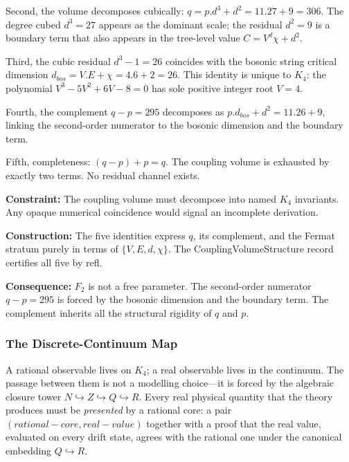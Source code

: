 \documentclass[11pt,a4paper]{book}
\def\cdot{.}%
\def\mathrm#1{#1}%
\def\mathbb#1{#1}%
\def\texttt#1{#1}%
\begin{document}
Second, the volume decomposes cubically: $q = p \cdot d^3 + d^2 =
11 \cdot 27 + 9 = 306$.  The degree cubed $d^3 = 27$ appears as the
dominant scale; the residual $d^2 = 9$ is a boundary term that also
appears in the tree-level value $C = V^d \chi + d^2$.

Third, the cubic residual $d^3 - 1 = 26$ coincides with the bosonic
string critical dimension $d_{\mathrm{bos}} = V \cdot E + \chi =
4 \cdot 6 + 2 = 26$.  This identity is unique to $K_4$: the polynomial
$V^3 - 5V^2 + 6V - 8 = 0$ has sole positive integer root $V = 4$.

Fourth, the complement $q - p = 295$ decomposes as $p \cdot d_{\mathrm{bos}} + d^2
= 11 \cdot 26 + 9$, linking the second-order numerator to the bosonic
dimension and the boundary term.

Fifth, completeness: $(q - p) + p = q$.  The coupling volume is
exhausted by exactly two terms.  No residual channel exists.

\textbf{Constraint:}
The coupling volume must decompose into named $K_4$ invariants.
Any opaque numerical coincidence would signal an incomplete derivation.

\textbf{Construction:}
The five identities express $q$, its complement, and the Fermat
stratum purely in terms of $\{V, E, d, \chi\}$.  The
\texttt{CouplingVolumeStructure} record certifies all five by
\texttt{refl}.

\textbf{Consequence:}
$F_2$ is not a free parameter.  The second-order numerator $q - p = 295$
is forced by the bosonic dimension and the boundary term.
The complement inherits all the structural rigidity of $q$ and $p$.

\begin{code}%
\>[0]\<%
\end{code}

\subsubsection*{The Discrete-Continuum Map}

A rational observable lives on $K_4$; a real observable lives in the continuum.
The passage between them is not a modelling choice---it is forced by the
algebraic closure tower $\mathbb{N} \hookrightarrow \mathbb{Z}
\hookrightarrow \mathbb{Q} \hookrightarrow \mathbb{R}$.  Every real physical
quantity that the theory produces must be \emph{presented} by a rational core:
a pair $(\texttt{rational-core}, \texttt{real-value})$ together with a proof
that the real value, evaluated on every drift state, agrees with the rational
one under the canonical embedding $\mathbb{Q} \hookrightarrow \mathbb{R}$.
\end{document}

